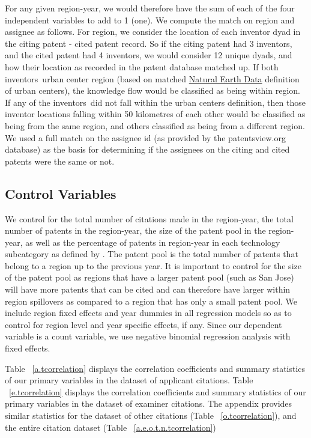 \documentclass[12pt,letterpaper]{article}
\begin{document}
For any given region-year, we would therefore have the sum of each of the four independent variables to add to 1 (one). We compute the match on region and assignee as follows. For region, we consider the location of each inventor dyad in the citing patent - cited patent record. So if the citing patent had 3 inventors, and the cited patent had 4 inventors, we would consider 12 unique dyads, and how their location as recorded in the patent database matched up. If both inventors\textquotesingle \ urban center region (based on  matched \href{http://www.naturalearthdata.com/downloads/10m-cultural-vectors/}{Natural Earth Data} definition of urban centers), the knowledge flow would be classified as being within region. If any of the inventors\textquotesingle \ did not fall within the urban centers definition, then those inventor locations falling within 50 kilometres of each other would be classified as being from the same region, and others classified as being from a different region. We used a full match on the assignee id (as provided by the patentsview.org database) as the basis for determining if the assignees on the citing and cited patents were the same or not.

\subsection{Control Variables}
We control for the total number of citations made in the region-year, the total number of patents in the region-year, the size of the patent pool in the region-year, as well as the percentage of patents in region-year in each technology subcategory as defined by \cite*{Hall2001a}. The patent pool is the total number of patents that belong to a region up to the previous year. It is important to control for the size of the patent pool as  regions that have a larger patent pool (such as San Jose) will have more patents that can be cited and can therefore have larger within region spillovers as compared to a region that has only a small patent pool. We include region fixed effects and year dummies in all regression models so as to control for region level and year specific effects, if any. Since our dependent variable is a count variable, we use negative binomial regression analysis with fixed effects. \par

Table ~\ref{a.tcorrelation} displays the correlation coefficients and summary statistics of our primary variables in the dataset of applicant  citations. Table ~\ref{e.tcorrelation} displays the correlation coefficients and summary statistics of our primary variables in the dataset of examiner  citations. The appendix provides similar statistics for the dataset of other citations (Table ~\ref{o.tcorrelation}), and the entire citation dataset (Table ~\ref{a.e.o.t.n.tcorrelation})
\end{document}
